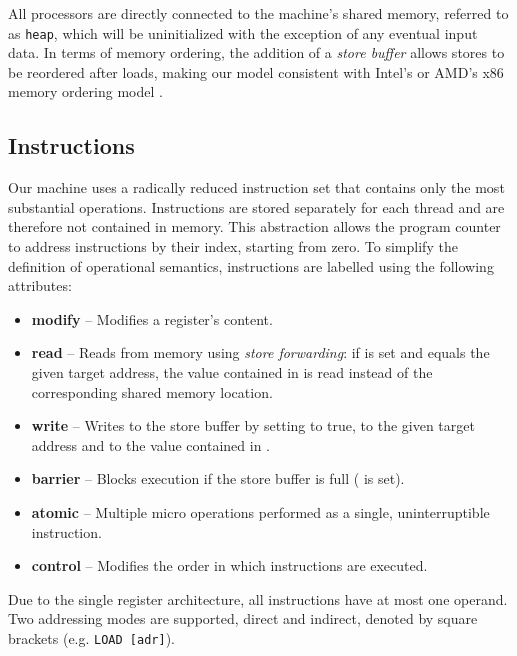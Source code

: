 All processors are directly connected to the machine's shared memory, referred to as \texttt{heap}, which will be uninitialized with the exception of any eventual input data.
In terms of memory ordering, the addition of a \emph{store buffer} allows stores to be reordered after loads, making our model consistent with Intel's or AMD's x86 memory ordering model \cite{ref:Intel, ref:AMD}.

\subsection{Instructions}

Our machine uses a radically reduced instruction set that contains only the most substantial operations.
Instructions are stored separately for each thread and are therefore not contained in memory.
This abstraction allows the program counter to address instructions by their index, starting from zero.
To simplify the definition of operational semantics, instructions are labelled using the following attributes:

\begin{itemize}
  \item \textbf{modify} -- Modifies a register's content.
  \item \textbf{read} -- Reads from memory using \emph{store forwarding}: if \SBFULL{} is set and \SBADR{} equals the given target address, the value contained in \SBVAL{} is read instead of the corresponding shared memory location.
  \item \textbf{write} -- Writes to the store buffer by setting \SBFULL{} to true, \SBADR{} to the given target address and \SBVAL{} to the value contained in \ACCU{}.
  \item \textbf{barrier} -- Blocks execution if the store buffer is full (\SBFULL{} is set). %
  \item \textbf{atomic} -- Multiple micro operations performed as a single, uninterruptible instruction.%
  \item \textbf{control} -- Modifies the order in which instructions are executed.
\end{itemize}

Due to the single register architecture, all instructions have at most one operand.
Two addressing modes are supported, direct and indirect, denoted by square brackets (e.g. \lstinline[language={[concubine]Assembler}]{LOAD [adr]}).

\newcommand{\defop}[3]{
  \paragraph{#1} \hfill #2
  \rule[0.5\baselineskip]{\textwidth}{0.1pt}\vspace{-0.5\baselineskip}\par\noindent
  #3
}

